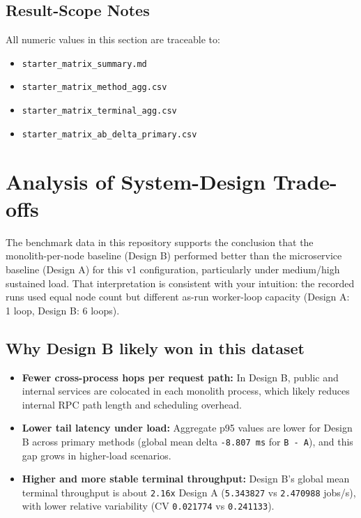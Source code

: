 \documentclass[11pt]{article}
\begin{document}
\subsection{Result-Scope Notes}
All numeric values in this section are traceable to:
\begin{itemize}
    \item \texttt{starter\_matrix\_summary.md}
    \item \texttt{starter\_matrix\_method\_agg.csv}
    \item \texttt{starter\_matrix\_terminal\_agg.csv}
    \item \texttt{starter\_matrix\_ab\_delta\_primary.csv}
\end{itemize}

\section{Analysis of System-Design Trade-offs}
The benchmark data in this repository supports the conclusion that the monolith-per-node baseline (Design B) performed better than the microservice baseline (Design A) for this v1 configuration, particularly under medium/high sustained load.
That interpretation is consistent with your intuition: the recorded runs used equal node count but different as-run worker-loop capacity (Design A: 1 loop, Design B: 6 loops).

\subsection{Why Design B likely won in this dataset}
\begin{itemize}
    \item \textbf{Fewer cross-process hops per request path:} In Design B, public and internal services are colocated in each monolith process, which likely reduces internal RPC path length and scheduling overhead.
    \item \textbf{Lower tail latency under load:} Aggregate p95 values are lower for Design B across primary methods (global mean delta \texttt{-8.807 ms} for \texttt{B - A}), and this gap grows in higher-load scenarios.
    \item \textbf{Higher and more stable terminal throughput:} Design B's global mean terminal throughput is about \texttt{2.16x} Design A (\texttt{5.343827} vs \texttt{2.470988} jobs/s), with lower relative variability (CV \texttt{0.021774} vs \texttt{0.241133}).
\end{itemize}
\end{document}
